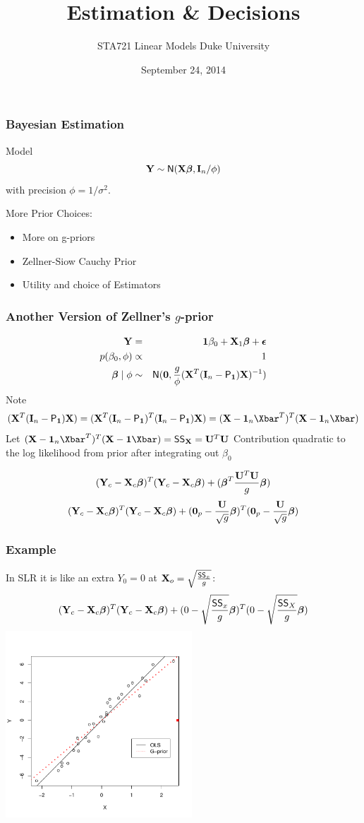 \documentclass[handout]{beamer}
\title{Estimation \& Decisions}
\institute{Merlise Clyde}
\author{STA721 Linear Models Duke University}
\date{September 24, 2014}
\begin{document}
\maketitle

\begin{frame}
  \frametitle{Bayesian Estimation}
  Model
$$
\mathbf{Y} \sim \textsf{N}(\mathbf{X} \boldsymbol{\beta}, \mathbf{I}_n/\phi)
$$
with precision $\phi = 1/\sigma^2$.   
\pause

\vfill
More Prior Choices:
\begin{itemize}
\item More on g-priors
\item Zellner-Siow Cauchy Prior
\item Utility and choice of Estimators
\end{itemize}
\end{frame}





\begin{frame}
\frametitle{Another Version of Zellner's $g$-prior }
\begin{eqnarray*}
\mathbf{Y} & = & \mathbf{1} \beta_0 + \mathbf{X}_1 \boldsymbol{\beta} + \boldsymbol{\epsilon} \\
p(\beta_0, \phi) & \propto & 1 \\  
\boldsymbol{\beta} \mid \phi & \sim & \textsf{N}(\mathbf{0}, \frac{g}{\phi} (\mathbf{X}^T (\mathbf{I}_n - \textsf{P}_{\mathbf{1}}) \mathbf{X})^{-1})
\end{eqnarray*}\pause
Note $$(\X^T (\I_n - \P_{\one}) \X) = (\X^T (\I_n - \P_{\one})^T (\I_n
- \P_{\one}) \X)  = (\X -\one_n \Xbar^T)^T (\X - \one_n \Xbar) $$
\pause
Let  $(\X -\one_n \Xbar^T)^T (\X - \one \Xbar) = \SS_{\X} = \U^T \U$
\pause
Contribution quadratic to the log likelihood from prior after integrating out $\beta_0$

$$ ( \mathbf{Y}_c  - \mathbf{X}_c \boldsymbol{\beta})^T(\mathbf{Y}_c - \mathbf{X}_c\boldsymbol{\beta}) + ( \boldsymbol{\beta}^T\frac{\mathbf{U}^T \mathbf{U}}{g} \boldsymbol{\beta})   $$
\pause
$$ ( \mathbf{Y}_c  - \mathbf{X}_c \boldsymbol{\beta})^T(\mathbf{Y}_c - \mathbf{X}_c\boldsymbol{\beta}) + ( \mathbf{0}_p -
\frac{\mathbf{U}}{\sqrt{g}}\boldsymbol{\beta})^T(\mathbf{0}_p -  \frac{\mathbf{U}}{\sqrt{g}} \boldsymbol{\beta})   $$

\end{frame}


\begin{frame}\frametitle{Example}

In SLR it is like an extra $Y_0 = 0$ at $\mathbf{X}_o = \sqrt{\frac{\textsf{SS}_x}{g}}$:
$$ ( \mathbf{Y}_c  - \mathbf{X}_c \boldsymbol{\beta})^T(\mathbf{Y}_c - \mathbf{X}_c\boldsymbol{\beta}) + (0 - \sqrt{\frac{\textsf{SS}_x}{g}}\boldsymbol{\beta})^T (0 - \sqrt{\frac{\textsf{SS}_X}{g}} \boldsymbol{\beta})   $$
\pause  
\vspace{-.25in}  \includegraphics[height=2.75in]{gprior}
\end{frame}
\end{document}
